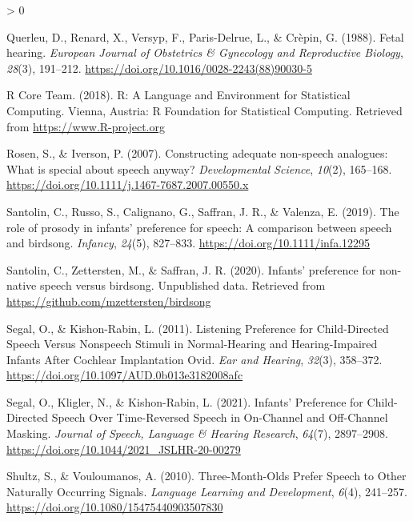 \documentclass[
  english,
  man]{apa6}
\newlength{\cslhangindent}
\newenvironment{CSLReferences}[2] %
 {%
  \setlength{\parindent}{0pt}
  \ifodd #1 \everypar{\setlength{\hangindent}{\cslhangindent}}\ignorespaces\fi
  \ifnum #2 > 0
  \setlength{\parskip}{#2\baselineskip}
  \fi
 }%
 {}
\begin{document}
\begin{CSLReferences}{1}{0}
\leavevmode\hypertarget{ref-querleu_fetal_1988}{}%
Querleu, D., Renard, X., Versyp, F., Paris-Delrue, L., \& Crèpin, G. (1988). Fetal hearing. \emph{European Journal of Obstetrics \& Gynecology and Reproductive Biology}, \emph{28}(3), 191--212. \url{https://doi.org/10.1016/0028-2243(88)90030-5}

\leavevmode\hypertarget{ref-r_core_team_r:_2018}{}%
R Core Team. (2018). R: {A} {Language} and {Environment} for {Statistical} {Computing}. Vienna, Austria: R Foundation for Statistical Computing. Retrieved from \url{https://www.R-project.org}

\leavevmode\hypertarget{ref-rosen_constructing_2007}{}%
Rosen, S., \& Iverson, P. (2007). Constructing adequate non-speech analogues: What is special about speech anyway? \emph{Developmental Science}, \emph{10}(2), 165--168. \url{https://doi.org/10.1111/j.1467-7687.2007.00550.x}

\leavevmode\hypertarget{ref-santolin_role_2019}{}%
Santolin, C., Russo, S., Calignano, G., Saffran, J. R., \& Valenza, E. (2019). The role of prosody in infants' preference for speech: {A} comparison between speech and birdsong. \emph{Infancy}, \emph{24}(5), 827--833. \url{https://doi.org/10.1111/infa.12295}

\leavevmode\hypertarget{ref-santolin_infants_2020}{}%
Santolin, C., Zettersten, M., \& Saffran, J. R. (2020). Infants' preference for non-native speech versus birdsong. {Unpublished} data. Retrieved from \url{https://github.com/mzettersten/birdsong}

\leavevmode\hypertarget{ref-segal_listening_2011}{}%
Segal, O., \& Kishon-Rabin, L. (2011). Listening {Preference} for {Child}-{Directed} {Speech} {Versus} {Nonspeech} {Stimuli} in {Normal}-{Hearing} and {Hearing}-{Impaired} {Infants} {After} {Cochlear} {Implantation} {{}} {Ovid}. \emph{Ear and Hearing}, \emph{32}(3), 358--372. \url{https://doi.org/10.1097/AUD.0b013e3182008afc}

\leavevmode\hypertarget{ref-segal_infants_2021}{}%
Segal, O., Kligler, N., \& Kishon-Rabin, L. (2021). Infants' {Preference} for {Child}-{Directed} {Speech} {Over} {Time}-{Reversed} {Speech} in {On}-{Channel} and {Off}-{Channel} {Masking}. \emph{Journal of Speech, Language \& Hearing Research}, \emph{64}(7), 2897--2908. \url{https://doi.org/10.1044/2021_JSLHR-20-00279}

\leavevmode\hypertarget{ref-shultz_three-month-olds_2010}{}%
Shultz, S., \& Vouloumanos, A. (2010). Three-{Month}-{Olds} {Prefer} {Speech} to {Other} {Naturally} {Occurring} {Signals}. \emph{Language Learning and Development}, \emph{6}(4), 241--257. \url{https://doi.org/10.1080/15475440903507830}


\end{CSLReferences}
\end{document}
